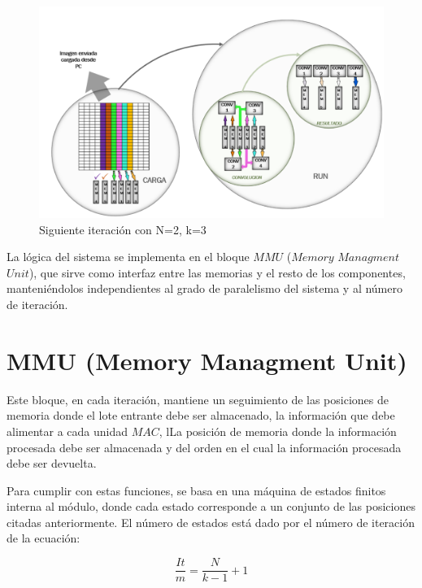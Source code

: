 \begin{figure}
\centering
\includegraphics[scale=0.7]{example_2}
\caption{Siguiente iteración con N=2, k=3}
\label{writingprocess4}
\end{figure}




La lógica del sistema se implementa en el bloque $MMU$ ($Memory$ $Managment$ $Unit$), que sirve como interfaz entre las memorias y el resto de los componentes, 
manteniéndolos independientes al grado de paralelismo del sistema y al número de iteración.

\bigskip

\section {MMU (Memory Managment Unit) }  \label{mmu_subsecc}
Este bloque, en cada iteración, mantiene un seguimiento de las posiciones de memoria donde el lote entrante debe ser almacenado,
la información que debe alimentar a cada unidad $MAC$, lLa posición de memoria donde la información procesada debe ser almacenada
y del orden en el cual la información procesada debe ser devuelta.

Para cumplir con estas funciones, se basa en una máquina de estados finitos interna al módulo, donde cada estado corresponde a un conjunto de las posiciones citadas anteriormente.
El número de estados está dado por el número de iteración de la ecuación:

\begin{equation}\label{niter}
  \frac{It}{m} = \frac{N}{k-1} + 1
\end{equation}
\bigskip


